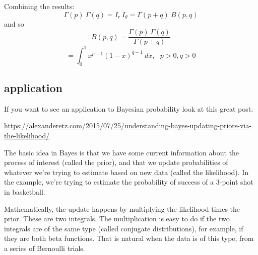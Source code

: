 \documentclass[11pt, oneside]{article}
\begin{document}
Combining the results:
\[ \Gamma(p) \ \Gamma(q) = I_r \ I_{\theta} = \Gamma (p + q) \ B(p,q) \]
and so
\[ B(p,q) = \frac{\Gamma(p) \ \Gamma(q)}{\Gamma (p + q)} \]
\[ = \int_0^1 x^{p - 1} (1 - x)^{q - 1} \ dx , \ \ \ p > 0, q > 0 \]

\subsection*{application}

If you want to see an application to Bayesian probability look at this great post:

\url{https://alexanderetz.com/2015/07/25/understanding-bayes-updating-priors-via-the-likelihood/}

The basic idea in Bayes is that we have some current information about the process of interest (called the prior), and that we update probabilities of whatever we're trying to estimate based on new data (called the likelihood).  In the example, we're trying to estimate the probability of success of a 3-point shot in basketball.

Mathematically, the update happens by multiplying the likelihood times the prior.  These are two integrals.  The multiplication is easy to do if the two integrals are of the same type (called conjugate distributions), for example, if they are both beta functions.  That is natural when the data is of this type, from a series of Bernoulli trials.
\end{document}
